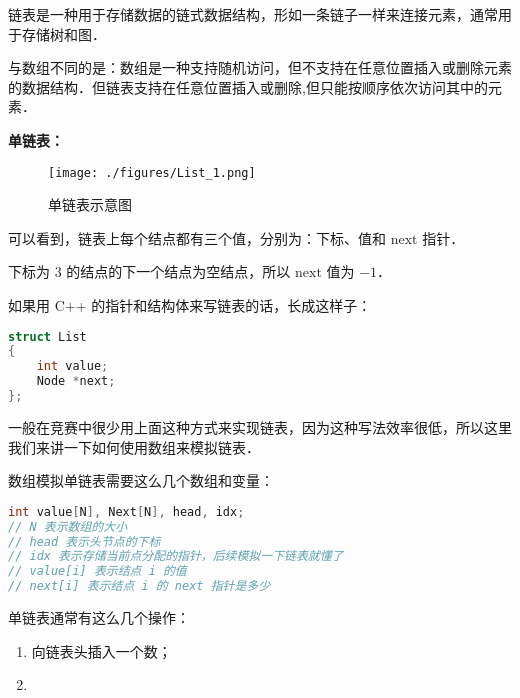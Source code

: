 
链表是一种用于存储数据的链式数据结构，形如一条链子一样来连接元素，通常用于存储树和图．

与数组不同的是：数组是一种支持随机访问，但不支持在任意位置插入或删除元素的数据结构．但链表支持在任意位置插入或删除,但只能按顺序依次访问其中的元素．

\textbf{单链表：}

\begin{figure}[ht]
\centering
\texttt{[image: ./figures/List\_1.png]}
\caption{单链表示意图} \label{List_fig1}
\end{figure}

可以看到，链表上每个结点都有三个值，分别为：下标、值和 $\text{next}$ 指针．

下标为 $3$ 的结点的下一个结点为空结点，所以 $\text{next}$ 值为 $-1$．

如果用 C++ 的指针和结构体来写链表的话，长成这样子：
\begin{lstlisting}[language=cpp]
struct List
{
    int value;
    Node *next;
};
\end{lstlisting}

一般在竞赛中很少用上面这种方式来实现链表，因为这种写法效率很低，所以这里我们来讲一下如何使用数组来模拟链表．

数组模拟单链表需要这么几个数组和变量：
\begin{lstlisting}[language=cpp]
int value[N], Next[N], head, idx;
// N 表示数组的大小
// head 表示头节点的下标
// idx 表示存储当前点分配的指针，后续模拟一下链表就懂了
// value[i] 表示结点 i 的值
// next[i] 表示结点 i 的 next 指针是多少
\end{lstlisting}

单链表通常有这么几个操作：
\begin{enumerate}
\item 向链表头插入一个数；
\item 

\end{enumerate}